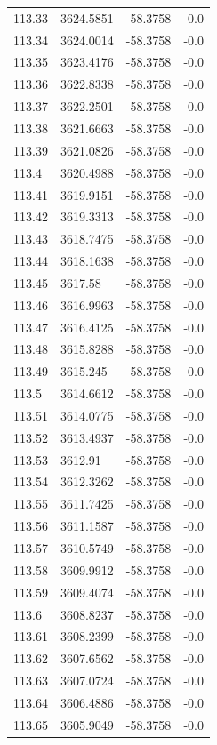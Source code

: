 \begin{table}[H]
\begin{tabular}{llll}
113.33 & 3624.5851 & -58.3758 & -0.0 \\
113.34 & 3624.0014 & -58.3758 & -0.0 \\
113.35 & 3623.4176 & -58.3758 & -0.0 \\
113.36 & 3622.8338 & -58.3758 & -0.0 \\
113.37 & 3622.2501 & -58.3758 & -0.0 \\
113.38 & 3621.6663 & -58.3758 & -0.0 \\
113.39 & 3621.0826 & -58.3758 & -0.0 \\
113.4 & 3620.4988 & -58.3758 & -0.0 \\
113.41 & 3619.9151 & -58.3758 & -0.0 \\
113.42 & 3619.3313 & -58.3758 & -0.0 \\
113.43 & 3618.7475 & -58.3758 & -0.0 \\
113.44 & 3618.1638 & -58.3758 & -0.0 \\
113.45 & 3617.58 & -58.3758 & -0.0 \\
113.46 & 3616.9963 & -58.3758 & -0.0 \\
113.47 & 3616.4125 & -58.3758 & -0.0 \\
113.48 & 3615.8288 & -58.3758 & -0.0 \\
113.49 & 3615.245 & -58.3758 & -0.0 \\
113.5 & 3614.6612 & -58.3758 & -0.0 \\
113.51 & 3614.0775 & -58.3758 & -0.0 \\
113.52 & 3613.4937 & -58.3758 & -0.0 \\
113.53 & 3612.91 & -58.3758 & -0.0 \\
113.54 & 3612.3262 & -58.3758 & -0.0 \\
113.55 & 3611.7425 & -58.3758 & -0.0 \\
113.56 & 3611.1587 & -58.3758 & -0.0 \\
113.57 & 3610.5749 & -58.3758 & -0.0 \\
113.58 & 3609.9912 & -58.3758 & -0.0 \\
113.59 & 3609.4074 & -58.3758 & -0.0 \\
113.6 & 3608.8237 & -58.3758 & -0.0 \\
113.61 & 3608.2399 & -58.3758 & -0.0 \\
113.62 & 3607.6562 & -58.3758 & -0.0 \\
113.63 & 3607.0724 & -58.3758 & -0.0 \\
113.64 & 3606.4886 & -58.3758 & -0.0 \\
113.65 & 3605.9049 & -58.3758 & -0.0 \\

\end{tabular}
\end{table}
